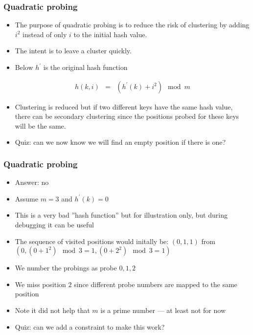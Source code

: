 \documentclass[trans]{beamer}
\begin{document}
\begin{frame}[fragile=singleslide]
\frametitle{Quadratic probing}
\begin{itemize}

\item
The purpose of quadratic probing is to reduce the risk of clustering by adding $i^2$ instead of only $i$
to the initial hash value. 
\item The intent is to leave a cluster quickly. 
\item Below $h^\prime$ is the original hash function 

\[
\begin{array}{ccc}
h(k, i) &=& (h^\prime(k) + i^2) \mod m
\end{array}
\]

\item Clustering is reduced but if two different keys have the same hash value, there can be 
{secondary clustering} since
the positions probed for these keys will be the same. 
\item Quiz: can we now know we will find an empty position if there is one?
\end{itemize}
\end{frame}
\begin{frame}[fragile=singleslide]
\frametitle{Quadratic probing}
\begin{itemize}

\item Answer: no
\item Assume $m = 3$ and $h^\prime(k) = 0$ 
\item This is a very bad ''hash function'' but for illustration only, but during debugging it can be useful
\item The sequence of visited positions would initally be: $(0, 1, 1)$ from\\
$(0, (0+1^2)\mod 3 = 1, (0+2^2)\mod 3 = 1)$
\item We number the probings as probe $0, 1, 2$
\item We miss position $2$ since different probe numbers are mapped to the same position
\item Note it did not help that $m$ is a prime number --- at least not for now
\item Quiz: can we add a constraint to make this work?
\end{itemize}
\end{frame}
\end{document}
